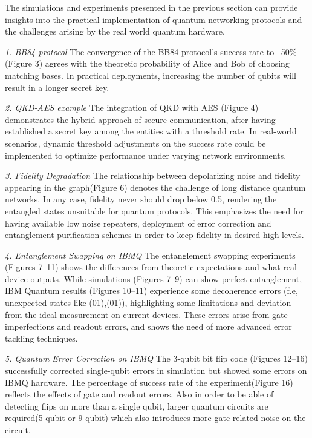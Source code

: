 \documentclass[12pt]{ieeetj}
\begin{document}
	The simulations and experiments presented in the previous section can provide insights into the practical implementation 
	of quantum networking protocols and the challenges arising by the real world quantum hardware. 

	\textit{1. BB84 protocol}
	\newline
	The convergence of the BB84 protocol’s success rate to ~50\% (Figure 3) agrees with the theoretic probability 
	of Alice and Bob of choosing matching bases. 
	In practical deployments, increasing the number of qubits will result in a longer secret key.
	

	\textit{2. QKD-AES example}
	\newline
	The integration of QKD with AES (Figure 4) demonstrates the hybrid approach of secure communication, 
	after having established a secret key among the entities with a threshold rate.
	In real-world scenarios, dynamic threshold adjustments on the success rate could be implemented to
	optimize performance under varying network environments. 
	

\textit{3. Fidelity Degradation}
	\newline
	The relationship between depolarizing noise and fidelity appearing in the graph(Figure 6) denotes the challenge of long distance quantum networks. 
	In any case, fidelity never should drop below 0.5, rendering the entangled states unsuitable for quantum protocols. 
	This emphasizes the need for having available low noise repeaters,
	deployment of error correction and entanglement purification schemes in order to keep fidelity in desired high levels.

\textit{4. Entanglement Swapping on IBMQ}
	\newline
	The entanglement swapping experiments (Figures 7–11) shows the differences from theoretic expectations and what real device outputs. 
	While simulations (Figures 7–9) can show perfect entanglement, IBM Quantum results (Figures 10–11) experience some decoherence errors 
	(f.e, unexpected states like (01),(01)), highlighting some limitations and deviation from the ideal measurement on current devices. 
	These errors arise from gate imperfections and readout errors, and shows the need of more advanced error tackling techniques.

\textit{5. Quantum Error Correction on IBMQ}
	\newline
	The 3-qubit bit flip code (Figures 12–16) successfully corrected single-qubit errors in simulation 
	but showed some errors on IBMQ hardware. 
	The percentage of success rate of the experiment(Figure 16) reflects the effects of gate and readout errors. 
	Also in order to be able of detecting flips on more than a single qubit, 
	larger quantum circuits are required(5-qubit or 9-qubit) which also introduces
	more gate-related noise on the circuit.
\end{document}
